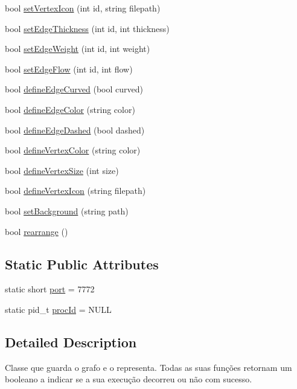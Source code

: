 \begin{DoxyCompactItemize}
bool \hyperlink{class_graph_viewer_a02d5f7393eab9a2d1b66719039597a64}{set\+Vertex\+Icon} (int id, string filepath)
\item 
bool \hyperlink{class_graph_viewer_a07f598272fe3515455eab13be749604a}{set\+Edge\+Thickness} (int id, int thickness)
\item 
bool \hyperlink{class_graph_viewer_ac211de009a0afe2e6d44f4f8d030a2cc}{set\+Edge\+Weight} (int id, int weight)
\item 
bool \hyperlink{class_graph_viewer_a69eb065145063e4dea41961e92e35c8e}{set\+Edge\+Flow} (int id, int flow)
\item 
bool \hyperlink{class_graph_viewer_a08f362be0e682d91e7506dca8caae1b8}{define\+Edge\+Curved} (bool curved)
\item 
bool \hyperlink{class_graph_viewer_a4102580b69826ba83251ef7bb262f8be}{define\+Edge\+Color} (string color)
\item 
bool \hyperlink{class_graph_viewer_af785279b5c204df0e274b20c36276fc3}{define\+Edge\+Dashed} (bool dashed)
\item 
bool \hyperlink{class_graph_viewer_a76de8676b7a93d72af514b84cdaa4d21}{define\+Vertex\+Color} (string color)
\item 
bool \hyperlink{class_graph_viewer_ac4b2a9fec74d38e64088aa79ca4b7d9b}{define\+Vertex\+Size} (int size)
\item 
bool \hyperlink{class_graph_viewer_af1adb6a361457187a820e01dcf0a34b7}{define\+Vertex\+Icon} (string filepath)
\item 
bool \hyperlink{class_graph_viewer_a02437b5fecd8b90de24436068312d593}{set\+Background} (string path)
\item 
bool \hyperlink{class_graph_viewer_a3009a66958686ccb7e78b68e37c3c423}{rearrange} ()
\end{DoxyCompactItemize}
\subsection*{Static Public Attributes}
\begin{DoxyCompactItemize}
\item 
static short \hyperlink{class_graph_viewer_a89d0abe75f41feededc49497cc514342}{port} = 7772
\item 
static pid\+\_\+t \hyperlink{class_graph_viewer_aeab74c57a4b672384f484884c000c692}{proc\+Id} = N\+U\+LL
\end{DoxyCompactItemize}


\subsection{Detailed Description}
Classe que guarda o grafo e o representa. Todas as suas funções retornam um booleano a indicar se a sua execução decorreu ou não com sucesso. 

